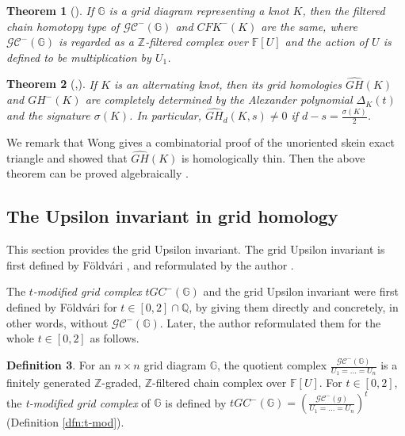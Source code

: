 \documentclass[12pt]{amsart}
\theoremstyle{plain}
\newtheorem{thm}{Theorem}[section]
\theoremstyle{definition}
\newtheorem{dfn}[thm]{Definition}
\theoremstyle{plain}
\theoremstyle{definition}
\newcommand{\G}{\mathbb{G}}
\numberwithin{equation}{section}
\begin{document}
\begin{thm}[{\cite[Theorem 3.3]{A-combinatorial-description-of-knot-Floer-homology}}]
\label{thm:grid=HFK}
If $\G$ is a grid diagram representing a knot $K$, then the filtered chain homotopy type of $\mathcal{GC}^-(\G)$ and $CFK^-(K)$ are the same, where $\mathcal{GC}^-(\G)$ is regarded as a $\mathbb{Z}$-filtered complex over $\mathbb{F}[U]$ and the action of $U$ is defined to be multiplication by $U_1$.
\end{thm}


\begin{thm}[{\cite[Theorem 1.6]{Grid-diagrams-and-Manolescu's-unoriented-skein-exact-triangle-for-knot-Floer-homology},\cite[Theorem 10.3.1 and Corollary 10.3.2]{Grid-homology-for-knots-and-links}}]
\label{thm:quasi-GH-determined}
If $K$ is an alternating knot, then its grid homologies $\widehat{GH}(K)$ and $GH^-(K)$ are completely determined by the Alexander polynomial $\Delta_K(t)$ and the signature $\sigma(K)$.
In particular, $\widehat{GH}_d(K,s)\neq 0$ if $d-s=\frac{\sigma(K)}{2}$. 
\end{thm}
We remark that Wong \cite{Grid-diagrams-and-Manolescu's-unoriented-skein-exact-triangle-for-knot-Floer-homology} gives a combinatorial proof of the unoriented skein exact triangle and showed that $\widehat{GH}(K)$ is homologically thin.
Then the above theorem can be proved algebraically \cite[Theorem 10.3.1 and Corollary 10.3.2]{Grid-homology-for-knots-and-links}.


\subsection{The Upsilon invariant in grid homology}
\label{sec:grid-homology-for-knots}
This section provides the grid Upsilon invariant.
The grid Upsilon invariant is first defined by F\"{o}ldv\'{a}ri \cite{The-knot-invariant-Upsilon-using-grid-homologies}, and reformulated by the author \cite{Concordance-invariant-Upsilon-for-balanced-spatial-graphs-using-grid-homology}.

The \textit{$t$-modified grid complex} $tGC^-(\G)$ and the grid Upsilon invariant were first defined by F\"{o}ldv\'{a}ri \cite{The-knot-invariant-Upsilon-using-grid-homologies} for $t\in[0,2]\cap\mathbb{Q}$, by giving them directly and concretely, in other words, without $\mathcal{GC}^-(\G)$.
Later, the author reformulated them for the whole $t\in[0,2]$ as follows.

\begin{dfn}
\label{dfn:t-grid}
For an $n\times n$ grid diagram $\G$, the quotient complex $\frac{\mathcal{GC}^-(\G)}{U_1=\dots=U_n}$ is a finitely generated $\mathbb{Z}$-graded, $\mathbb{Z}$-filtered chain complex over $\mathbb{F}[U]$.
For $t\in[0,2]$, the \textit{t-modified grid complex} of $\G$ is defined by $tGC^-(\G)=\left(\frac{\mathcal{GC}^-(g)}{U_1=\dots=U_n}\right)^t$ (Definition \ref{dfn:t-mod}).
\end{dfn}
\end{document}
